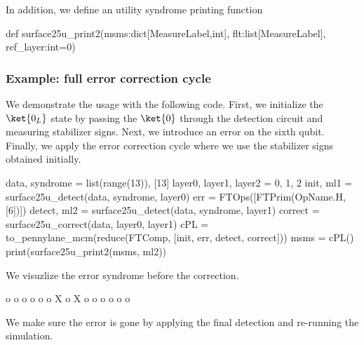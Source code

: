 \li In addition, we define an utility syndrome printing function

  \begin{python}
  def surface25u_print2(msms:dict[MeasureLabel,int], flt:list[MeasureLabel], ref_layer:int=0)
  \end{python}

\le

\subsubsection{Example: full error correction cycle}

We demonstrate the usage with the following code. First, we initialize the $\ket{0_L}$ state by
passing the $\ket{0}$ through the detection circuit and measuring stabilizer signs. Next, we
introduce an error on the sixth qubit. Finally, we apply the error correction cycle where we use the
stabilizer signs obtained initially.

  \begin{python}
  data, syndrome = list(range(13)), [13]
  layer0, layer1, layer2 = 0, 1, 2
  init, ml1 = surface25u_detect(data, syndrome, layer0)
  err = FTOps([FTPrim(OpName.H,[6])])
  detect, ml2 = surface25u_detect(data, syndrome, layer1)
  correct = surface25u_correct(data, layer0, layer1)
  cPL = to_pennylane_mcm(reduce(FTComp, [init, err, detect, correct]))
  msms = cPL()
  print(surface25u_print2(msms, ml2))
  \end{python}

We visuzlize the error syndrome before the correction.

  \begin{result}

  o   o   o
    o   o 
  o X o X o
    o   o 
  o   o   o

  \end{result}

We make sure the error is gone by applying the final detection and re-running the simulation.

